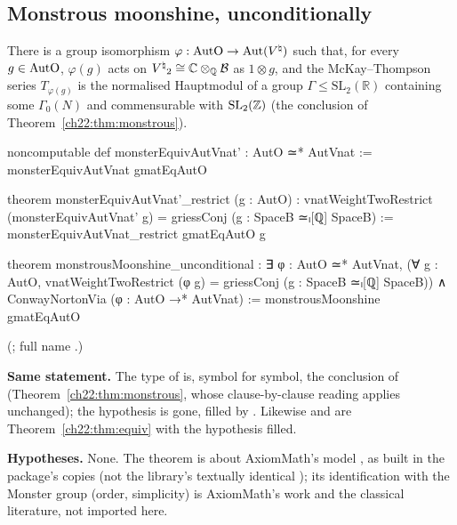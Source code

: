 \subsection{Monstrous moonshine, unconditionally}

\begin{theorem}\label{ch22:thm:unconditional}
There is a group isomorphism $\varphi:\mathrm{AutO}\to\operatorname{Aut}({V^{\natural}})$ such that, for every $g\in\mathrm{AutO}$,
$\varphi(g)$ acts on ${V^{\natural}}_2\cong{\mathbb{C}}\otimes_{\mathbb{Q}}\mathcal{B}$ as $1\otimes g$, and the McKay--Thompson series $T_{\varphi(g)}$
is the normalised Hauptmodul of a group $\Gamma\le\mathrm{SL}_2(\mathbb R)$ containing some $\Gamma_0(N)$ and commensurable
with $\mathrm{SL}_2({\mathbb{Z}})$ (the conclusion of Theorem~\ref{ch22:thm:monstrous}).
\end{theorem}
\begin{leancode}
noncomputable def monsterEquivAutVnat' : AutO ≃* AutVnat :=
  monsterEquivAutVnat gmatEqAutO

theorem monsterEquivAutVnat'_restrict (g : AutO) :
    vnatWeightTwoRestrict (monsterEquivAutVnat' g) =
      griessConj (g : SpaceB ≃ₗ[ℚ] SpaceB) :=
  monsterEquivAutVnat_restrict gmatEqAutO g

theorem monstrousMoonshine_unconditional :
    ∃ φ : AutO ≃* AutVnat,
      (∀ g : AutO, vnatWeightTwoRestrict (φ g) = griessConj (g : SpaceB ≃ₗ[ℚ] SpaceB)) ∧
        ConwayNortonVia (φ : AutO →* AutVnat) :=
  monstrousMoonshine gmatEqAutO
\end{leancode}
(; full name
.)
\begin{dictionary}
\textbf{Same statement.}  The type of  is, symbol for symbol, the conclusion of
 (Theorem~\ref{ch22:thm:monstrous}, whose clause-by-clause reading applies unchanged); the
hypothesis  is gone, filled by .  Likewise  and
 are Theorem~\ref{ch22:thm:equiv} with the hypothesis filled.

\textbf{Hypotheses.}  None.  The theorem is about AxiomMath's model , as built in the package's copies (not the
library's textually identical ); its identification with the Monster group (order, simplicity) is AxiomMath's
work and the classical literature, not imported here.
\end{dictionary}
